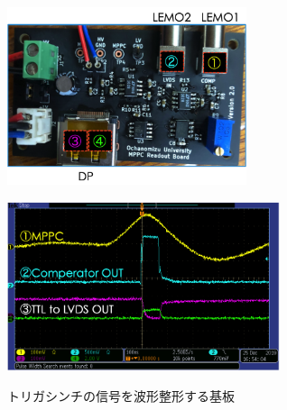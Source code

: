 \begin{figure}[h]
  \centering
  \begin{minipage}[b]{0.45\linewidth}
    \centering
    \includegraphics[width=7cm]{./figure/pcb.png}
    \label{fig:pcb}
  \end{minipage}
  \begin{minipage}[b]{0.45\linewidth}
    \centering
    \includegraphics[width=8cm]{./figure/pcbosiro.png}
    \label{fig:extosiro}
  \end{minipage}
  \caption{トリガシンチの信号を波形整形する基板}
\end{figure}


%
%

